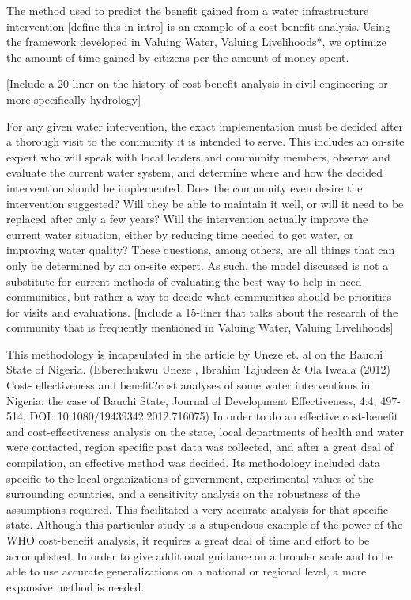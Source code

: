 The method used to predict the benefit gained from a water infrastructure intervention [define this in intro] is an example of a cost-benefit analysis. Using the framework developed in Valuing Water, Valuing Livelihoods*, we optimize the amount of time gained by citizens per the amount of money spent.

[Include a 20-liner on the history of cost benefit analysis in civil engineering or more specifically hydrology]

For any given water intervention, the exact implementation must be decided after a thorough visit to the community it is intended to serve.
This includes an on-site expert who will speak with local leaders and community members, observe and evaluate the current water system, and determine where and how the decided intervention should be implemented.
Does the community even desire the intervention suggested?
Will they be able to maintain it well, or will it need to be replaced after only a few years?
Will the intervention actually improve the current water situation, either by reducing time needed to get water, or improving water quality?
These questions, among others, are all things that can only be determined by an on-site expert.
As such, the model discussed is not a substitute for current methods of evaluating the best way to help in-need communities, but rather a way to decide what communities should be priorities for visits and evaluations.
[Include a 15-liner that talks about the research of the community that is frequently mentioned in Valuing Water, Valuing Livelihoods]

This methodology is incapsulated in the article by Uneze et. al on the Bauchi State of Nigeria. (Eberechukwu Uneze , Ibrahim Tajudeen \& Ola Iweala (2012) Cost- effectiveness and benefit?cost analyses of some water interventions in Nigeria: the case of Bauchi State, Journal of Development Effectiveness, 4:4, 497-514, DOI: 10.1080/19439342.2012.716075)
In order to do an effective cost-benefit and cost-effectiveness analysis on the state, local departments of health and water were contacted, region specific past data was collected, and after a great deal of compilation, an effective method was decided.
Its methodology included data specific to the local organizations of government, experimental values of the surrounding countries, and a sensitivity analysis on the robustness of the assumptions required.
This facilitated a very accurate analysis for that specific state.
Although this particular study is a stupendous example of the power of the WHO cost-benefit analysis, it requires a great deal of time and effort to be accomplished.
In order to give additional guidance on a broader scale and to be able to use accurate generalizations on a national or regional level, a more expansive method is needed.